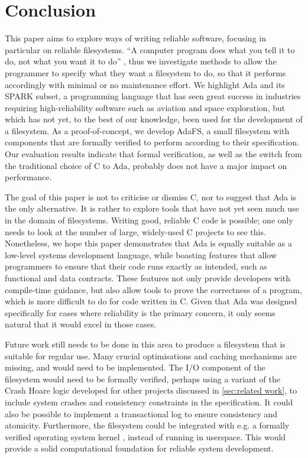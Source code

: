 \section{Conclusion}
This paper aims to explore ways of writing reliable software, focusing in particular on reliable filesystems.
``A computer program does what you tell it to do, not what you want it to do'' \cite{bloch1997}, thus we investigate methods to allow the programmer to specify what they want a filesystem to do, so that it performs accordingly with minimal or no maintenance effort.
We highlight Ada and its SPARK subset, a programming language that has seen great success in industries requiring high-reliability software such as aviation and space exploration, but which has not yet, to the best of our knowledge, been used for the development of a filesystem.
As a proof-of-concept, we develop AdaFS, a small filesystem with components that are formally verified to perform according to their specification.
Our evaluation results indicate that formal verification, as well as the switch from the traditional choice of C to Ada, probably does not have a major impact on performance.

The goal of this paper is not to criticise or dismiss C, nor to suggest that Ada is the only alternative.
It is rather to explore tools that have not yet seen much use in the domain of filesystems.
Writing good, reliable C code is possible; one only needs to look at the number of large, widely-used C projects to see this.
Nonetheless, we hope this paper demonstrates that Ada is equally suitable as a low-level systems development language, while boasting features that allow programmers to ensure that their code runs exactly as intended, such as functional and data contracts.
These features not only provide developers with compile-time guidance, but also allow tools to prove the correctness of a program, which is more difficult to do for code written in C.
Given that Ada was designed specifically for cases where reliability is the primary concern, it only seems natural that it would excel in those cases.

Future work still needs to be done in this area to produce a filesystem that is suitable for regular use.
Many crucial optimisations and caching mechanisms are missing, and would need to be implemented.
The I/O component of the filesystem would need to be formally verified, perhaps using a variant of the Crash Hoare logic developed for other projects discussed in \autoref{sec:related work}, to include system crashes and consistency constraints in the specification.
It could also be possible to implement a transactional log to ensure consistency and atomicity.
Furthermore, the filesystem could be integrated with e.g. a formally verified operating system kernel \cite{king2019}, instead of running in userspace.
This would provide a solid computational foundation for reliable system development.
